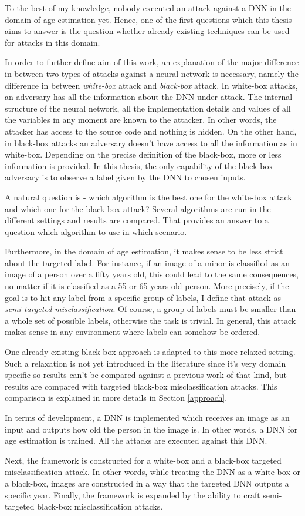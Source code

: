 To the best of my knowledge, nobody executed an attack against a DNN in the domain of age estimation yet. Hence, one of the first questions which this thesis aims to answer is the question whether already existing techniques can be used for attacks in this domain.

In order to further define aim of this work, an explanation of the major difference in between two types of attacks against a neural network is necessary, namely the difference in between \textit{white-box} attack and \textit{black-box} attack. 
In white-box attacks, an adversary has all the information about the DNN under attack. The internal structure of the neural network, all the implementation details and values of all the variables in any moment are known to the attacker. In other words, the attacker has access to the source code and nothing is hidden.
On the other hand, in black-box attacks an adversary doesn't have access to all the information as in white-box. Depending on the precise definition of the black-box, more or less information is provided. In this thesis, the only capability of the black-box adversary is to observe a label given by the DNN to chosen inputs.

A natural question is - which algorithm is the best one for the white-box attack and which one for the black-box attack? Several algorithms are run in the different settings and results are compared. That provides an answer to a question which algorithm to use in which scenario.

Furthermore, in the domain of age estimation, it makes sense to be less strict about the targeted label. For instance, if an image of a minor is classified as an image of a person over a fifty years old, this could lead to the same consequences, no matter if it is classified as a 55 or 65 years old person. More precisely, if the goal is to hit any label from a specific group of labels, I define that attack as \textit{semi-targeted misclassification}. Of course, a group of labels must be smaller than a whole set of possible labels, otherwise the task is trivial. In general, this attack makes sense in any environment where labels can somehow be ordered.

One already existing black-box approach is adapted to this more relaxed setting. Such a relaxation is not yet introduced in the literature since it's very domain specific so results can't be compared against a previous work of that kind, but results are compared with targeted black-box misclassification attacks. This comparison is explained in more details in Section \ref{approach}. 

In terms of development, a DNN is implemented which receives an image as an input and outputs how old the person in the image is. In other words, a DNN for age estimation is trained. All the attacks are executed against this DNN. 

Next, the framework is constructed for a white-box and a black-box targeted misclassification attack. In other words, while treating the DNN as a white-box or a black-box, images  are constructed in a way that the targeted DNN outputs a specific year. Finally, the framework is expanded by the ability to craft semi-targeted black-box misclassification attacks.